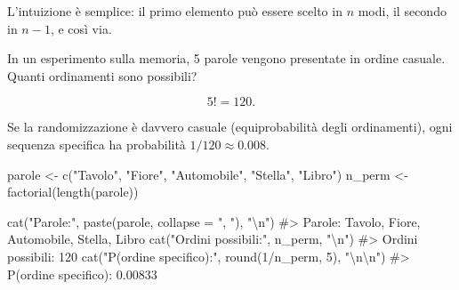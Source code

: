 \documentclass[
  italian,
  letterpaper,
  a4paper,
  11pt,
  open=any]{scrbook}
\newenvironment{Shaded}{\begin{snugshade}}{\end{snugshade}}
\newcommand{\AttributeTok}[1]{\textcolor[rgb]{0.40,0.45,0.13}{#1}}
\newcommand{\CommentTok}[1]{\textcolor[rgb]{0.37,0.37,0.37}{#1}}
\newcommand{\DecValTok}[1]{\textcolor[rgb]{0.68,0.00,0.00}{#1}}
\newcommand{\FunctionTok}[1]{\textcolor[rgb]{0.28,0.35,0.67}{#1}}
\newcommand{\NormalTok}[1]{\textcolor[rgb]{0.00,0.23,0.31}{#1}}
\newcommand{\OtherTok}[1]{\textcolor[rgb]{0.00,0.23,0.31}{#1}}
\newcommand{\SpecialCharTok}[1]{\textcolor[rgb]{0.37,0.37,0.37}{#1}}
\newcommand{\StringTok}[1]{\textcolor[rgb]{0.13,0.47,0.30}{#1}}
\theoremstyle{plain}
\theoremstyle{definition}
\theoremstyle{definition}
\theoremstyle{remark}
\begin{document}
L'intuizione è semplice: il primo elemento può essere scelto in \(n\)
modi, il secondo in \(n-1\), e così via.

\begin{tcolorbox}[enhanced jigsaw, arc=.35mm, bottomrule=.15mm, bottomtitle=1mm, breakable, colback=white, colbacktitle=quarto-callout-note-color!10!white, colframe=quarto-callout-note-color-frame, coltitle=black, left=2mm, leftrule=.75mm, opacityback=0, opacitybacktitle=0.6, rightrule=.15mm, title=\textcolor{quarto-callout-note-color}{\faInfo}\hspace{0.5em}{Esempio psicologico}, titlerule=0mm, toprule=.15mm, toptitle=1mm]

In un esperimento sulla memoria, 5 parole vengono presentate in ordine
casuale. Quanti ordinamenti sono possibili?

\[
5! = 120.
\]

Se la randomizzazione è davvero casuale (equiprobabilità degli
ordinamenti), ogni sequenza specifica ha probabilità
\(1/120 \approx 0.008\).

\begin{Shaded}
\begin{Highlighting}[]
\NormalTok{parole }\OtherTok{\textless{}{-}} \FunctionTok{c}\NormalTok{(}\StringTok{"Tavolo"}\NormalTok{, }\StringTok{"Fiore"}\NormalTok{, }\StringTok{"Automobile"}\NormalTok{, }\StringTok{"Stella"}\NormalTok{, }\StringTok{"Libro"}\NormalTok{)}
\NormalTok{n\_perm }\OtherTok{\textless{}{-}} \FunctionTok{factorial}\NormalTok{(}\FunctionTok{length}\NormalTok{(parole))}

\FunctionTok{cat}\NormalTok{(}\StringTok{"Parole:"}\NormalTok{, }\FunctionTok{paste}\NormalTok{(parole, }\AttributeTok{collapse =} \StringTok{", "}\NormalTok{), }\StringTok{"}\SpecialCharTok{\textbackslash{}n}\StringTok{"}\NormalTok{)}
\CommentTok{\#\textgreater{} Parole: Tavolo, Fiore, Automobile, Stella, Libro}
\FunctionTok{cat}\NormalTok{(}\StringTok{"Ordini possibili:"}\NormalTok{, n\_perm, }\StringTok{"}\SpecialCharTok{\textbackslash{}n}\StringTok{"}\NormalTok{)}
\CommentTok{\#\textgreater{} Ordini possibili: 120}
\FunctionTok{cat}\NormalTok{(}\StringTok{"P(ordine specifico):"}\NormalTok{, }\FunctionTok{round}\NormalTok{(}\DecValTok{1}\SpecialCharTok{/}\NormalTok{n\_perm, }\DecValTok{5}\NormalTok{), }\StringTok{"}\SpecialCharTok{\textbackslash{}n\textbackslash{}n}\StringTok{"}\NormalTok{)}
\CommentTok{\#\textgreater{} P(ordine specifico): 0.00833}


\end{Highlighting}
\end{Shaded}
\end{tcolorbox}
\end{document}
